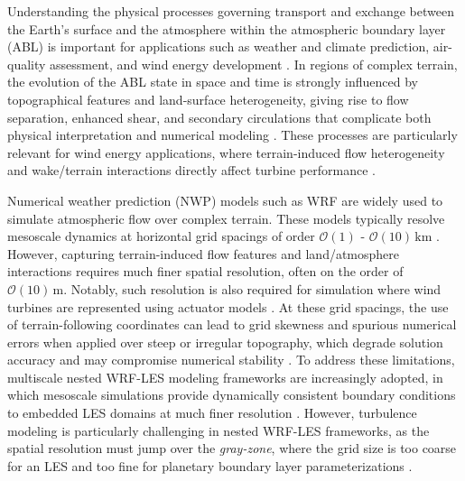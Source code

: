 \documentclass[%
superscriptaddress,
 amsmath,amssymb,
pra,
showkeys,
]{revtex4-2}
\begin{document}
Understanding the physical processes governing transport and exchange between the Earth’s surface and the atmosphere within the atmospheric boundary layer (ABL) is important for applications such as weather and climate prediction, air-quality assessment, and wind energy development \cite{chow2019crossing, lehner2018current, clifton2022research}. In regions of complex terrain, the evolution of the ABL state in space and time is strongly influenced by topographical features and land-surface heterogeneity, giving rise to flow separation, enhanced shear, and secondary circulations that complicate both physical interpretation and numerical modeling \cite{chow2019crossing, giani2024sensitivity}. These processes are particularly relevant for wind energy applications, where terrain-induced flow heterogeneity and wake/terrain interactions directly affect turbine performance \cite{lehner2018current}.

Numerical weather prediction (NWP) models such as WRF \cite{michalakes2001, michalakes2005weather} are widely used to simulate atmospheric flow over complex terrain. These models typically resolve mesoscale dynamics at horizontal grid spacings of order $\mathcal{O}(1)$ - $\mathcal{O}(10)\,\mathrm{km}$ \citep{giani2024sensitivity,powers2017weather}. However, capturing terrain-induced flow features and land/atmosphere interactions requires much finer spatial resolution, often on the order of $\mathcal{O}(10)\,\mathrm{m}$. Notably, such resolution is also required for simulation where wind turbines are represented using actuator models \cite{wu2013simulation, maas2022wake, cheung2023investigations, lanzilao2024parametric, stipaafm2024}. At these grid spacings, the use of terrain-following coordinates can lead to grid skewness and spurious numerical errors when applied over steep or irregular topography, which degrade solution accuracy and may compromise numerical stability \cite{lundquist2010immersed, lundquist2012immersed, daniels2016new, arthur2019using}. To address these limitations, multiscale nested WRF-LES modeling frameworks are increasingly adopted, in which mesoscale simulations provide dynamically consistent boundary conditions to embedded LES domains at much finer resolution \cite{mirocha2010implementation,talbot2012nested,munoz2014bridging,munoz2015stochastic,powers2017weather,liu2020simulation}. However, turbulence modeling is particularly challenging in nested WRF-LES frameworks, as the spatial resolution must jump over the \textit{gray-zone}, where the grid size is too coarse for an LES and too fine for planetary boundary layer parameterizations \cite{wyngaard2004toward, chow2019crossing}.
\end{document}
